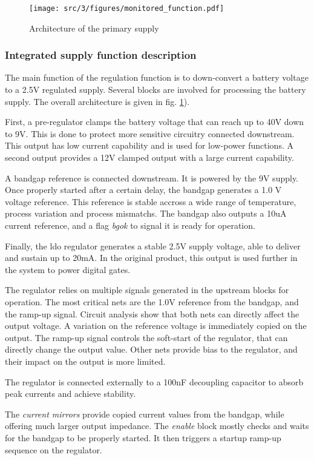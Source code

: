 \begin{figure}[!htbp]
  \centering
  \texttt{[image: src/3/figures/monitored\_function.pdf]}
  \caption{Architecture of the primary supply}
  \label{fig:monitored_function}
\end{figure}


\subsubsection{Integrated supply function description}

The main function of the regulation function is to down-convert a battery voltage to a 2.5V regulated supply.
Several blocks are involved for processing the battery supply.
The overall architecture is given in fig. \ref{fig:monitored_function}).

First, a pre-regulator clamps the battery voltage that can reach up to 40V down to 9V.
This is done to protect more sensitive circuitry connected downstream.
This output has low current capability and is used for low-power functions.
A second output provides a 12V clamped output with a large current capability.

A bandgap reference is connected downstream.
It is powered by the 9V supply.
Once properly started after a certain delay, the bandgap generates a 1.0 V voltage reference.
This reference is stable accross a wide range of temperature, process variation and process mismatchs.
The bandgap also outputs a 10uA current reference, and a flag \textit{bgok} to signal it is ready for operation.

Finally, the \gls{ldo} regulator generates a stable 2.5V supply voltage, able to deliver and sustain up to 20mA.
In the original product, this output is used further in the system to power digital gates.

The regulator relies on multiple signals generated in the upstream blocks for operation.
The most critical nets are the 1.0V reference from the bandgap, and the ramp-up signal.
Circuit analysis show that both nets can directly affect the output voltage.
A variation on the reference voltage is immediately copied on the output.
The ramp-up signal controls the soft-start of the regulator, that can directly change the output value.
Other nets provide bias to the regulator, and their impact on the output is more limited.

The regulator is connected externally to a 100nF decoupling capacitor to absorb peak currents and achieve stability.

The \textit{current mirrors} provide copied current values from the bandgap, while offering much larger output impedance.
The \textit{enable} block mostly checks and waits for the bandgap to be properly started.
It then triggers a startup ramp-up sequence on the regulator.
